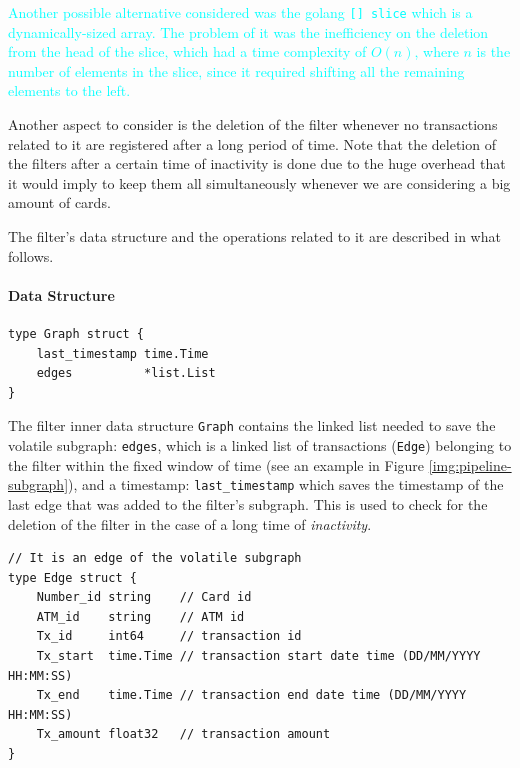 \textcolor{cyan}{Another possible alternative considered was the golang \texttt{[] slice} which is a dynamically-sized array. The problem of it was the inefficiency on the deletion from the head of the slice, which had a time complexity of 
$O(n)$, where $n$ is the number of elements in the slice, since it required shifting all the remaining elements to the left.}

Another aspect to consider is the deletion of the filter whenever no transactions related to it are registered after a long period of time. Note that the deletion of the filters after a certain time of inactivity is done due to the huge overhead that it would imply to keep them all simultaneously whenever we are considering a big amount of cards.

The filter's data structure and the operations related to it are described in what follows.

\paragraph{Data Structure}

\begin{center}
\lstset{style=golangStyle}
\begin{lstlisting}[caption={filter subgraph data structure}]
type Graph struct {
	last_timestamp time.Time
	edges          *list.List
}
\end{lstlisting}
\end{center}

The filter inner data structure \texttt{Graph} contains the linked list needed to save the volatile subgraph: \texttt{edges}, which is a linked list of transactions (\texttt{Edge}) belonging to the filter within the fixed window of time (see an example in Figure \ref{img:pipeline-subgraph}), and a timestamp: \texttt{last\_timestamp} which saves the timestamp of the last edge that was added to the filter's subgraph. This is used to check for the deletion of the filter in the case of a long time of \textit{inactivity}.

\begin{center}
\lstset{style=golangStyle}
\begin{lstlisting}[caption={Edge of the volatile subgraph, a transaction belonging to the filter}]
// It is an edge of the volatile subgraph
type Edge struct {
	Number_id string    // Card id
	ATM_id    string    // ATM id
	Tx_id     int64     // transaction id
	Tx_start  time.Time // transaction start date time (DD/MM/YYYY HH:MM:SS)
	Tx_end    time.Time // transaction end date time (DD/MM/YYYY HH:MM:SS)
	Tx_amount float32   // transaction amount
}
\end{lstlisting}
\end{center}

